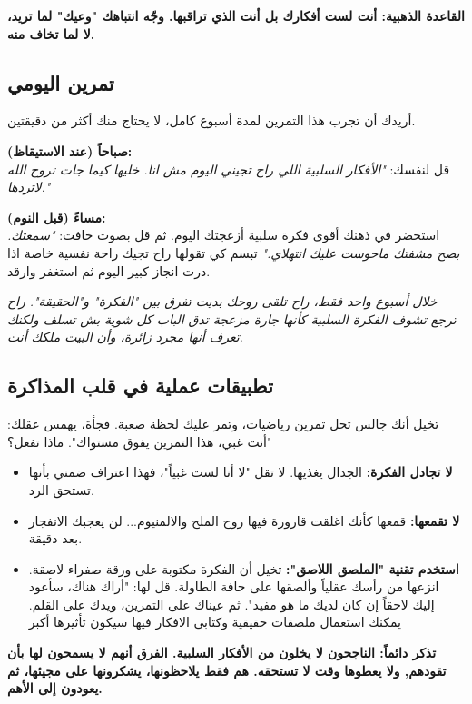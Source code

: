 \documentclass[12pt,a4paper]{book}
\newcommand{\quoteAr}[1]{%
	\begin{myquote}
		\itshape #1
	\end{myquote}
}
\newcommand{\importantAr}[1]{%
	\begin{important}
		\bfseries #1
	\end{important}
}
\begin{document}
\importantAr{القاعدة الذهبية: أنت لست أفكارك بل أنت الذي تراقبها. وجّه انتباهك "وعيك" لما تريد، لا لما تخاف منه.}
	
	\subsection{تمرين اليومي}
	
	أريدك أن تجرب هذا التمرين لمدة أسبوع كامل، لا يحتاج منك أكثر من دقيقتين.
	
	\textbf{صباحاً (عند الاستيقاظ):} \\
	قل لنفسك: \textit{"الأفكار السلبية اللي راح تجيني اليوم مش انا. خليها كيما جات تروح الله لاتردها."}
	
	
	\textbf{مساءً (قبل النوم):} \\
	استحضر في ذهنك أقوى فكرة سلبية أزعجتك اليوم. ثم قل بصوت خافت: \textit{ "سمعتك. بصح مشفتك ماحوست عليك انتهلاي."} تبسم كي تقولها راح تجيك راحة نفسية خاصة اذا درت انجاز كبير اليوم ثم استغفر وارقد.
	
	\quoteAr{خلال أسبوع واحد فقط، راح تلقى روحك بديت تفرق بين "الفكرة" و"الحقيقة". راح ترجع تشوف الفكرة السلبية كأنها جارة مزعجة تدق الباب كل شوية بش تسلف  ولكنك تعرف أنها مجرد زائرة، وأن البيت ملكك أنت.}
	
	\subsection{تطبيقات عملية في قلب المذاكرة}
	
	تخيل أنك جالس تحل تمرين رياضيات، وتمر عليك لحظة صعبة. فجأة، يهمس عقلك: "أنت غبي، هذا التمرين يفوق مستواك". ماذا تفعل؟
	
	\begin{itemize}
		\item \textbf{لا تجادل الفكرة:} الجدال يغذيها. لا تقل "لا أنا لست غبياً"، فهذا اعتراف ضمني بأنها تستحق الرد.
		\item \textbf{لا تقمعها:} قمعها كأنك اغلقت قارورة فيها روح الملح والالمنيوم... لن يعجبك الانفجار بعد دقيقة.
		\item \textbf{استخدم تقنية "الملصق اللاصق":} تخيل أن الفكرة مكتوبة على ورقة صفراء لاصقة. انزعها من رأسك عقلياً وألصقها على حافة الطاولة. قل لها: "أراك هناك، سأعود إليك لاحقاً إن كان لديك ما هو مفيد". ثم عيناك على التمرين، ويدك على القلم. يمكنك استعمال ملصقات حقيقية وكتابى الافكار فيها سيكون تأثيرها أكبر
	\end{itemize}
	
	\importantAr{تذكر دائماً: الناجحون لا يخلون من الأفكار السلبية. الفرق أنهم لا يسمحون لها بأن تقودهم, ولا يعطوها وقت لا تستحقه. هم فقط يلاحظونها، يشكرونها على مجيئها، ثم يعودون إلى الأهم.}
	
\end{document}
